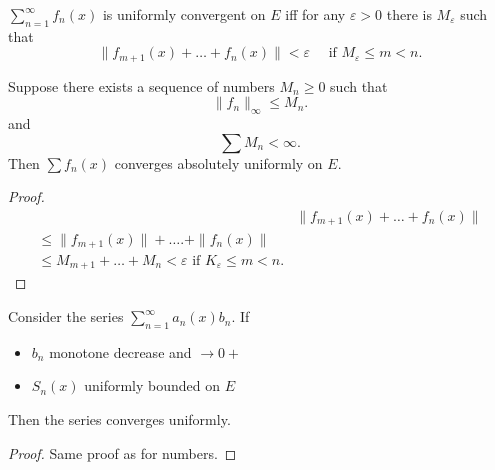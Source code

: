 \begin{proposition}
	$\sum_{n=1}^{\infty} f_n(x)$ is uniformly convergent on $E$ iff for any $\varepsilon>0$ there is $M_\varepsilon$ such that
	\[
		\|f_{m+1}(x) + \ldots + f_n(x)\| < \varepsilon
		\quad \text{ if } M_\varepsilon \le m < n
	.\]
\end{proposition}

\begin{theorem}
	Suppose there exists a sequence of numbers $M_n \ge 0$ such that
	\[
		\|f_n\|_\infty  \le M_n
	.\] 
	and
	\[
		\sum M_n < \infty 
	.\] 
	Then $\sum f_n(x)$ converges absolutely uniformly on $E$.
\end{theorem}
\begin{proof}
	 \begin{align*}
		&\|f_{m+1}(x) + \ldots + f_n(x)\| \\
		\le \|f_{m+1}\left( x \right) \| + \ldots.+ \|f_n(x)\|\\
		\le M_{m+1} + \ldots + M_n < \varepsilon \text{ if } K_\varepsilon \le m < n
	.\end{align*}
\end{proof}

\begin{theorem}
	Consider the series $\sum_{n=1}^{\infty} a_n(x) b_n $. If 
	\begin{itemize}
		\item  $b_n$ monotone decrease and $\to 0+$
		\item $S_n(x)$ uniformly bounded on $E$
	\end{itemize}
	Then the series converges uniformly.
\end{theorem}
\begin{proof}
	Same proof as for numbers.
\end{proof}

